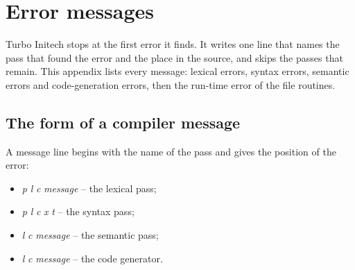 \chapter{Error messages}

Turbo Initech stops at the first error it finds.  It writes one line that
names the pass that found the error and the place in the source, and
skips the passes that remain.  This appendix lists every message:
lexical errors, syntax errors, semantic errors and code-generation errors,
then the run-time error of the file routines.

\section{The form of a compiler message}
A message line begins with the name of the pass and gives the position of
the error:

\begin{itemize}
\item {}\textit{p} \textit{l}
  \textit{c} \textit{message} -- the lexical pass;
\item {}\textit{p} \textit{l}
  \textit{c} \textit{x} \textit{t}
  -- the syntax pass;
\item {}\textit{l} \textit{c}
  \textit{message} -- the semantic pass;
\item {}\textit{l} \textit{c}
  \textit{message} -- the code generator.
\end{itemize}

